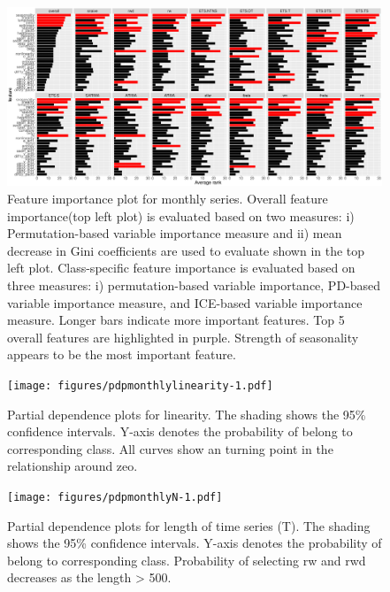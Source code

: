 \documentclass[11pt,a4paper,]{article}
\begin{document}
\begin{figure}
\centering
\includegraphics{figures/vimonthly-1.pdf}
\caption{\label{fig:vimonthly}Feature importance plot for monthly series. Overall feature importance(top left plot) is evaluated based on two measures: i) Permutation-based variable importance measure and ii) mean decrease in Gini coefficients are used to evaluate shown in the top left plot. Class-specific feature importance is evaluated based on three measures: i) permutation-based variable importance, PD-based variable importance measure, and ICE-based variable importance measure. Longer bars indicate more important features. Top 5 overall features are highlighted in purple. Strength of seasonality appears to be the most important feature.}
\end{figure}

\begin{figure}
\centering
\texttt{[image: figures/pdpmonthlylinearity-1.pdf]}
\caption{\label{fig:pdpmonthlylinearity}Partial dependence plots for linearity. The shading shows the 95\% confidence intervals. Y-axis denotes the probability of belong to corresponding class. All curves show an turning point in the relationship around zeo.}
\end{figure}

\begin{figure}
\centering
\texttt{[image: figures/pdpmonthlyN-1.pdf]}
\caption{\label{fig:pdpmonthlyN}Partial dependence plots for length of time series (T). The shading shows the 95\% confidence intervals. Y-axis denotes the probability of belong to corresponding class. Probability of selecting rw and rwd decreases as the length \textgreater{} 500.}
\end{figure}
\end{document}
